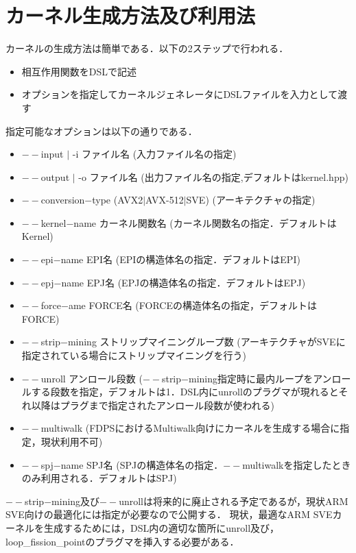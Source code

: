 \documentclass{article}
\begin{document}

\section{カーネル生成方法及び利用法}
カーネルの生成方法は簡単である．以下の2ステップで行われる．
 \begin{itemize}
  \item 相互作用関数をDSLで記述
  \item オプションを指定してカーネルジェネレータにDSLファイルを入力として渡す
 \end{itemize}
 指定可能なオプションは以下の通りである．
  \begin{itemize}
   \item $--$input $|$ -i ファイル名 (入力ファイル名の指定)
   \item $--$output $|$ -o ファイル名 (出力ファイル名の指定,デフォルトはkernel.hpp)
   \item $--$conversion$-$type (AVX2$|$AVX-512$|$SVE) (アーキテクチャの指定)
   \item $--$kernel$-$name カーネル関数名 (カーネル関数名の指定．デフォルトはKernel)
   \item $--$epi$-$name EPI名 (EPIの構造体名の指定．デフォルトはEPI)
   \item $--$epj$-$name EPJ名 (EPJの構造体名の指定．デフォルトはEPJ)
   \item $--$force$-$ame FORCE名 (FORCEの構造体名の指定，デフォルトはFORCE)
   \item $--$strip$-$mining ストリップマイニングループ数 (アーキテクチャがSVEに指定されている場合にストリップマイニングを行う)
   \item $--$unroll アンロール段数 ($--$strip$-$mining指定時に最内ループをアンロールする段数を指定，デフォルトは1．DSL内にunrollのプラグマが現れるとそれ以降はプラグまで指定されたアンロール段数が使われる)
   \item $--$multiwalk (FDPSにおけるMultiwalk向けにカーネルを生成する場合に指定，現状利用不可)
   \item $--$spj$-$name SPJ名 (SPJの構造体名の指定．$--$multiwalkを指定したときのみ利用される．デフォルトはSPJ)
  \end{itemize}
  $--$strip$-$mining及び$--$unrollは将来的に廃止される予定であるが，現状ARM SVE向けの最適化には指定が必要なので公開する．
  現状，最適なARM SVEカーネルを生成するためには，DSL内の適切な箇所にunroll及び，loop\_fission\_pointのプラグマを挿入する必要がある．
\end{document}
